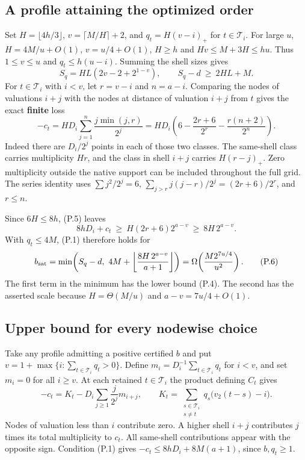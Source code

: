 \documentclass[
  11pt,
]{article}
\begin{document}
\subsection{A profile attaining the optimized
order}\label{a-profile-attaining-the-optimized-order}

Set \(H=\lfloor4h/3\rfloor\), \(v=\lceil M/H\rceil+2\), and
\(q_t=H(v-i)_+\) for \(t\in\mathcal T_i\). For large \(u\),
\(H=4M/u+O(1)\), \(v=u/4+O(1)\), \(H\ge h\) and \(Hv\le M+3H\le hu\).
Thus \(1\le v\le u\) and \(q_t\le h(u-i)\). Summing the shell sizes
gives \[
 S_q=HL(2v-2+2^{1-v}),\qquad S_q-d\ \ge\ 2HL+M.         \tag{P.4}
\] For \(t\in\mathcal T_i\) with \(i<v\), let \(r=v-i\) and \(n=a-i\).
Comparing the nodes of valuations \(i+j\) with the nodes at distance of
valuation \(i+j\) from \(t\) gives the exact \textbf{finite} loss \[
 -c_t=H D_i\sum_{j=1}^{n}\frac{j\min(j,r)}{2^j}
     =H D_i\!\left(6-\frac{2r+6}{2^r}
                          -\frac{r(n+2)}{2^n}\right).       \tag{P.5}
\] Indeed there are \(D_i/2^j\) points in each of those two classes. The
same-shell class carries multiplicity \(Hr\), and the class in shell
\(i+j\) carries \(H(r-j)_+\). Zero multiplicity outside the native
support can be included throughout the full grid. The series identity
uses \(\sum j^2/2^j=6\), \(\sum_{j>r}j(j-r)/2^j=(2r+6)/2^r\), and
\(r\le n\).

Since \(6H\le8h\), (P.5) leaves \[
 8hD_i+c_t\ \ge\ H(2r+6)2^{a-v}\ \ge\ 8H\,2^{a-v}.
\] With \(q_t\le4M\), (P.1) therefore holds for \[
 b_{\rm sat}=\min\!\left(S_q-d,\ 4M+
       \left\lfloor\frac{8H\,2^{a-v}}{a+1}\right\rfloor\right)
       =\Omega\!\left(\frac{M2^{7u/4}}{u^2}\right).         \tag{P.6}
\] The first term in the minimum has the lower bound (P.4). The second
has the asserted scale because \(H=\Theta(M/u)\) and \(a-v=7u/4+O(1)\).

\subsection{Upper bound for every nodewise
choice}\label{upper-bound-for-every-nodewise-choice}

Take any profile admitting a positive certified \(b\) and put
\(v=1+\max\{i:\sum_{t\in\mathcal T_i}q_t>0\}\). Define
\(m_i=D_i^{-1}\sum_{t\in\mathcal T_i}q_t\) for \(i<v\), and set
\(m_i=0\) for all \(i\ge v\). At each retained \(t\in\mathcal T_i\) the
product defining \(C_t\) gives \[
 -c_t=K_t-D_i\sum_{j\ge1}\frac j{2^j}m_{i+j},\qquad
 K_t=\sum_{\substack{s\in\mathcal T_i\\s\ne t}}
                   q_s\big(v_2(t-s)-i\big).                 \tag{P.7}
\] Nodes of valuation less than \(i\) contribute zero. A higher shell
\(i+j\) contributes \(j\) times its total multiplicity to \(c_t\). All
same-shell contributions appear with the opposite sign. Condition (P.1)
gives \(-c_t\le8hD_i+8M(a+1)\), since \(b,q_t\ge1\).
\end{document}
